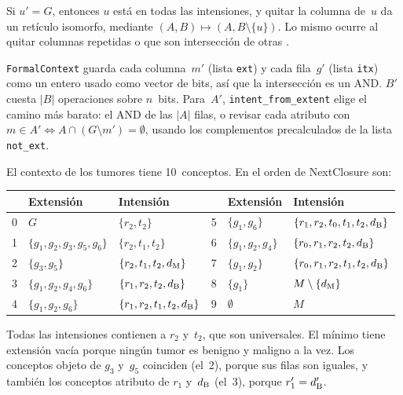 \begin{proposicion}\label{prop:universal}
Si $u' = G$, entonces $u$ está en todas las intensiones, y quitar la columna de~$u$ da un retículo isomorfo, mediante $(A, B) \mapsto (A, B \setminus \{u\})$. Lo mismo ocurre al quitar columnas repetidas o que son intersección de otras \parencite{ganter1999}.
\end{proposicion}

\begin{observacion}\label{obs:bits}
\texttt{FormalContext} guarda cada columna~$m'$ (lista \texttt{ext}) y cada fila~$g'$ (lista \texttt{itx}) como un entero usado como vector de bits, así que la intersección es un AND. $B'$ cuesta $\lvert B \rvert$ operaciones sobre $n$~bits. Para~$A'$, \texttt{intent\_from\_extent} elige el camino más barato: el AND de las $\lvert A \rvert$ filas, o revisar cada atributo con $m \in A' \iff A \cap (G \setminus m') = \emptyset$, usando los complementos precalculados de la lista \texttt{not\_ext}.
\end{observacion}

\begin{ejemplo}\label{ej:conceptos}
El contexto de los tumores tiene 10~conceptos. En el orden de NextClosure son:
\begin{center}
\small
\begin{tabular}{rll@{\qquad}rll}
  \toprule
  & Extensión & Intensión & & Extensión & Intensión \\
  \midrule
  0 & $G$ & $\{r_2, t_2\}$ & 5 & $\{g_1, g_6\}$ & $\{r_1, r_2, t_0, t_1, t_2, d_{\mathrm{B}}\}$ \\
  1 & $\{g_1, g_2, g_3, g_5, g_6\}$ & $\{r_2, t_1, t_2\}$ & 6 & $\{g_1, g_2, g_4\}$ & $\{r_0, r_1, r_2, t_2, d_{\mathrm{B}}\}$ \\
  2 & $\{g_3, g_5\}$ & $\{r_2, t_1, t_2, d_{\mathrm{M}}\}$ & 7 & $\{g_1, g_2\}$ & $\{r_0, r_1, r_2, t_1, t_2, d_{\mathrm{B}}\}$ \\
  3 & $\{g_1, g_2, g_4, g_6\}$ & $\{r_1, r_2, t_2, d_{\mathrm{B}}\}$ & 8 & $\{g_1\}$ & $M \setminus \{d_{\mathrm{M}}\}$ \\
  4 & $\{g_1, g_2, g_6\}$ & $\{r_1, r_2, t_1, t_2, d_{\mathrm{B}}\}$ & 9 & $\emptyset$ & $M$ \\
  \bottomrule
\end{tabular}
\end{center}
Todas las intensiones contienen a $r_2$ y~$t_2$, que son universales. El mínimo tiene extensión vacía porque ningún tumor es benigno y maligno a la vez. Los conceptos objeto de $g_3$ y~$g_5$ coinciden (el~2), porque sus filas son iguales, y también los conceptos atributo de $r_1$ y~$d_{\mathrm{B}}$ (el~3), porque $r_1' = d_{\mathrm{B}}'$.
\end{ejemplo}


